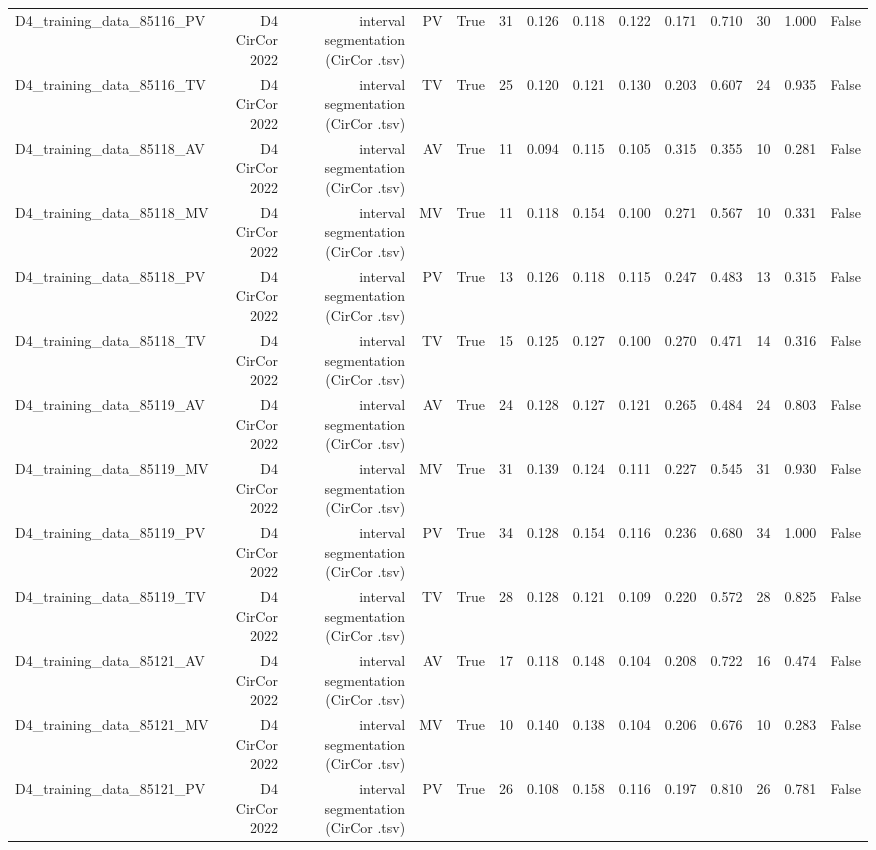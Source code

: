 \begin{table}[htbp]
\begin{tabular}{lrrrrrrrrrrrrr}
    D4\_training\_data\_85116\_PV & D4 CirCor 2022 & interval segmentation (CirCor .tsv) & PV & True & 31 & 0.126 & 0.118 & 0.122 & 0.171 & 0.710 & 30 & 1.000 & False \\
    D4\_training\_data\_85116\_TV & D4 CirCor 2022 & interval segmentation (CirCor .tsv) & TV & True & 25 & 0.120 & 0.121 & 0.130 & 0.203 & 0.607 & 24 & 0.935 & False \\
    D4\_training\_data\_85118\_AV & D4 CirCor 2022 & interval segmentation (CirCor .tsv) & AV & True & 11 & 0.094 & 0.115 & 0.105 & 0.315 & 0.355 & 10 & 0.281 & False \\
    D4\_training\_data\_85118\_MV & D4 CirCor 2022 & interval segmentation (CirCor .tsv) & MV & True & 11 & 0.118 & 0.154 & 0.100 & 0.271 & 0.567 & 10 & 0.331 & False \\
    D4\_training\_data\_85118\_PV & D4 CirCor 2022 & interval segmentation (CirCor .tsv) & PV & True & 13 & 0.126 & 0.118 & 0.115 & 0.247 & 0.483 & 13 & 0.315 & False \\
    D4\_training\_data\_85118\_TV & D4 CirCor 2022 & interval segmentation (CirCor .tsv) & TV & True & 15 & 0.125 & 0.127 & 0.100 & 0.270 & 0.471 & 14 & 0.316 & False \\
    D4\_training\_data\_85119\_AV & D4 CirCor 2022 & interval segmentation (CirCor .tsv) & AV & True & 24 & 0.128 & 0.127 & 0.121 & 0.265 & 0.484 & 24 & 0.803 & False \\
    D4\_training\_data\_85119\_MV & D4 CirCor 2022 & interval segmentation (CirCor .tsv) & MV & True & 31 & 0.139 & 0.124 & 0.111 & 0.227 & 0.545 & 31 & 0.930 & False \\
    D4\_training\_data\_85119\_PV & D4 CirCor 2022 & interval segmentation (CirCor .tsv) & PV & True & 34 & 0.128 & 0.154 & 0.116 & 0.236 & 0.680 & 34 & 1.000 & False \\
    D4\_training\_data\_85119\_TV & D4 CirCor 2022 & interval segmentation (CirCor .tsv) & TV & True & 28 & 0.128 & 0.121 & 0.109 & 0.220 & 0.572 & 28 & 0.825 & False \\
    D4\_training\_data\_85121\_AV & D4 CirCor 2022 & interval segmentation (CirCor .tsv) & AV & True & 17 & 0.118 & 0.148 & 0.104 & 0.208 & 0.722 & 16 & 0.474 & False \\
    D4\_training\_data\_85121\_MV & D4 CirCor 2022 & interval segmentation (CirCor .tsv) & MV & True & 10 & 0.140 & 0.138 & 0.104 & 0.206 & 0.676 & 10 & 0.283 & False \\
    D4\_training\_data\_85121\_PV & D4 CirCor 2022 & interval segmentation (CirCor .tsv) & PV & True & 26 & 0.108 & 0.158 & 0.116 & 0.197 & 0.810 & 26 & 0.781 & False \\

\end{tabular}
\end{table}
